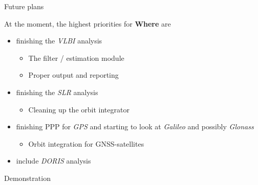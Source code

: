 \documentclass[ignorenonframetext,12pt,t]{beamer}
\providecommand{\tightlist}{%
  \setlength{\itemsep}{0pt}\setlength{\parskip}{0pt}}
\begin{document}
\begin{frame}{Future plans}

At the moment, the highest priorities for \textbf{Where} are

\begin{itemize}
\item
  finishing the \emph{VLBI} analysis

  \begin{itemize}
  \item
    The filter / estimation module
  \item
    Proper output and reporting
  \end{itemize}
\item
  finishing the \emph{SLR} analysis

  \begin{itemize}
  \tightlist
  \item
    Cleaning up the orbit integrator
  \end{itemize}
\item
  finishing PPP for \emph{GPS} and starting to look at \emph{Galileo}
  and possibly \emph{Glonass}

  \begin{itemize}
  \tightlist
  \item
    Orbit integration for GNSS-satellites
  \end{itemize}
\item
  include \emph{DORIS} analysis
\end{itemize}

\end{frame}

\begin{frame}{Demonstration}

\end{frame}
\end{document}
